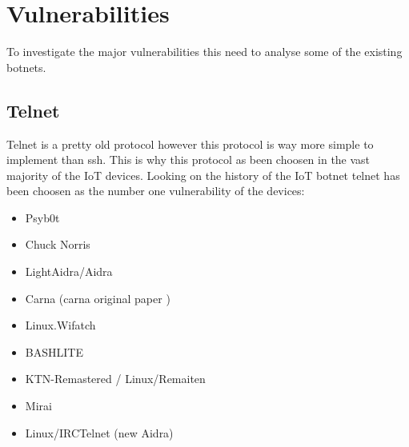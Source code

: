 \documentclass{report}
\begin{document}
\section{Vulnerabilities}
To investigate the major vulnerabilities this need to analyse some of the existing botnets.

\subsection{Telnet}
Telnet is a pretty old protocol \autocite{davidson1977arpanet} however this protocol is way more simple to implement than ssh. This is why this protocol as been choosen in the vast majority of the IoT devices. Looking on the history of the IoT botnet telnet has been choosen as the number one vulnerability of the devices:

\begin{itemize}
 \item Psyb0t \autocite{durfina2013psybot}
 \item Chuck Norris \autocite{celeda2010embedded}
 \item LightAidra/Aidra \autocite{aidra}
 \item Carna \autocite{krenc2014internet} (carna original paper \autocite{carna})
 \item Linux.Wifatch \autocite{wifatch}
 \item BASHLITE \autocite{bashlite}
 \item KTN-Remastered / Linux/Remaiten \autocite{remaiten}
 \item Mirai \autocite{kolias2017ddos}
 \item Linux/IRCTelnet (new Aidra) \autocite{irctelnet}
\end{itemize}
\end{document}
